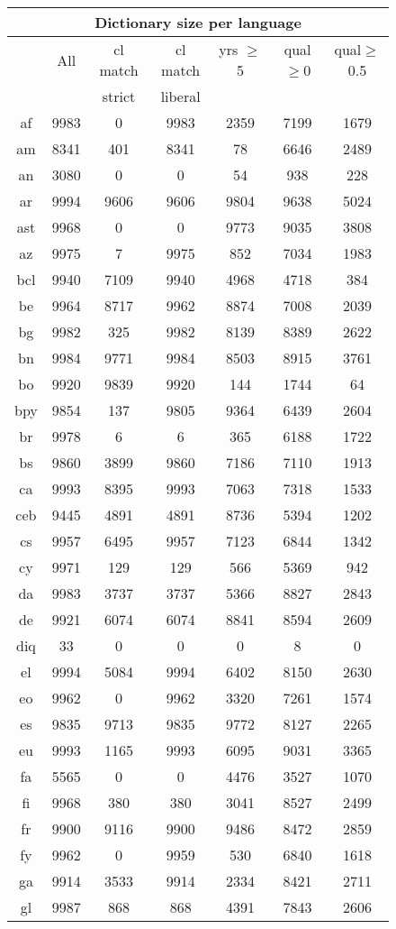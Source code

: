 \begin{figure}[h]
\centering
\begin{tabular}{ccccccc}
\multicolumn{7}{c}{Dictionary size per language}\\
\hline\hline
&All&cl match&cl match&yrs $\geq$ 5&qual$\geq$0&qual$\geq$0.5\\
&&strict&liberal&&&\\\hline\hline
af&9983&0&9983&2359&7199&1679\\
am&8341&401&8341&78&6646&2489\\
an&3080&0&0&54&938&228\\
ar&9994&9606&9606&9804&9638&5024\\
ast&9968&0&0&9773&9035&3808\\
az&9975&7&9975&852&7034&1983\\
bcl&9940&7109&9940&4968&4718&384\\
be&9964&8717&9962&8874&7008&2039\\
bg&9982&325&9982&8139&8389&2622\\
bn&9984&9771&9984&8503&8915&3761\\
bo&9920&9839&9920&144&1744&64\\
bpy&9854&137&9805&9364&6439&2604\\
br&9978&6&6&365&6188&1722\\
bs&9860&3899&9860&7186&7110&1913\\
ca&9993&8395&9993&7063&7318&1533\\
ceb&9445&4891&4891&8736&5394&1202\\
cs&9957&6495&9957&7123&6844&1342\\
cy&9971&129&129&566&5369&942\\
da&9983&3737&3737&5366&8827&2843\\
de&9921&6074&6074&8841&8594&2609\\
diq&33&0&0&0&8&0\\
el&9994&5084&9994&6402&8150&2630\\
eo&9962&0&9962&3320&7261&1574\\
es&9835&9713&9835&9772&8127&2265\\
eu&9993&1165&9993&6095&9031&3365\\
fa&5565&0&0&4476&3527&1070\\
fi&9968&380&380&3041&8527&2499\\
fr&9900&9116&9900&9486&8472&2859\\
fy&9962&0&9959&530&6840&1618\\
ga&9914&3533&9914&2334&8421&2711\\
gl&9987&868&868&4391&7843&2606\\

\end{tabular}
\end{figure}
